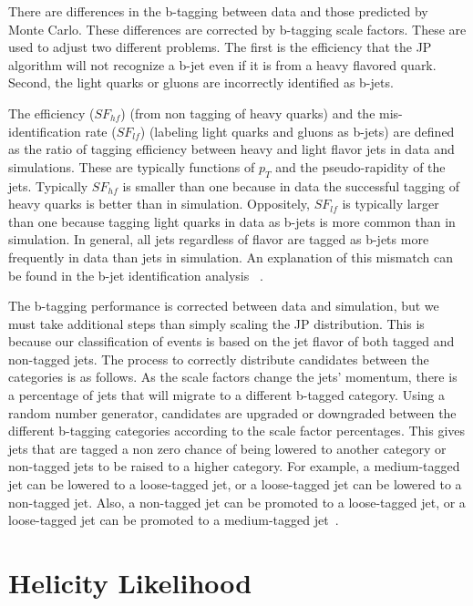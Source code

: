 There are differences in the b-tagging between data and those predicted by Monte Carlo.  These differences are corrected by b-tagging scale factors.  These are used to adjust two different problems.  The first is the efficiency that the JP algorithm will not recognize a b-jet even if it is from a heavy flavored quark.  Second, the light quarks or gluons are incorrectly identified as b-jets.  

The efficiency ($SF_{hf}$) (from non tagging of heavy quarks) and the mis-identification rate ($SF_{lf}$) (labeling light quarks and gluons as b-jets) are defined as the ratio of tagging efficiency between heavy and light flavor jets in data and simulations.  These are typically functions of $p_T$ and the pseudo-rapidity of the jets.  Typically $SF_{hf}$ is smaller than one because in data the successful tagging of heavy quarks is better than in simulation.  Oppositely, $SF_{lf}$ is typically larger than one because tagging light quarks in data as b-jets is more common than in simulation.  In general, all jets regardless of flavor are tagged as b-jets more frequently in data than jets in simulation. An explanation of this mismatch can be found in the b-jet identification analysis ~\cite{CMS-PAS-BTV-11-004}.

The b-tagging performance is corrected between data and simulation, but we must take additional steps than simply scaling the JP distribution.  This is because our classification of events is based on the jet flavor of both tagged and non-tagged jets.  The process to correctly distribute candidates between the categories is as follows.  As the scale factors change the jets' momentum, there is a percentage of jets that will migrate to a different b-tagged category. Using a random number generator, candidates are upgraded or downgraded between the different b-tagging categories according to the scale factor percentages. This gives jets that are tagged a non zero chance of being lowered to another category or non-tagged jets to be raised to a higher category.  For example, a medium-tagged jet can be lowered to a loose-tagged jet, or a loose-tagged jet can be lowered to a non-tagged jet.  Also, a non-tagged jet can be promoted to a loose-tagged jet, or a loose-tagged jet can be promoted to a medium-tagged jet~\cite{2l2q115}.


\section{Helicity Likelihood}

